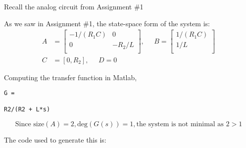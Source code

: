 \section{}
Recall the analog circuit from Assignment \#1

As we saw in Assignment \#1, the state-space form of the system is:
\begin{align*}
    A &= 
    \begin{bmatrix}
        -1/(R_1 C) & 0 \\
        0 & -R_2/L \\
    \end{bmatrix}, \;\;\;\;\;
    B =
    \begin{bmatrix}
        1/(R_1 C) \\
        1/L \\
    \end{bmatrix} \\
    C &=
    [0, R_2], \;\;\;\;\;
    D = 0
\end{align*}

Computing the transfer function in Matlab,
\begin{verbatim}
G =
 
R2/(R2 + L*s)
\end{verbatim}
\[\boxed{\text{Since size}(A) = 2, \text{deg}(G(s)) = 1, \text{the system is not minimal as } 2 > 1}\]

The code used to generate this is:
